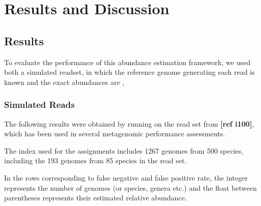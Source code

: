 
\chapter{Results and Discussion} %
\label{Chapter4}

\section{Results}

To evaluate the performance of this abundance estimation framework, we used both a simulated readset, in which the reference genome generating each read is known and the exact abundances are ,

\subsection{Simulated Reads}

The following results were obtained by running  on the read set from \textbf{[ref i100]}, which has been used in several metagenomic performance assessments.

The index used for the assignments includes 1267 genomes from 500 species, including the 193 genomes from 85 species in the read set.

In the rows corresponding to false negative and false positive rate, the integer
represents the number of genomes (or species, genera etc.) and the float between
parentheses represents their estimated relative abundance.

